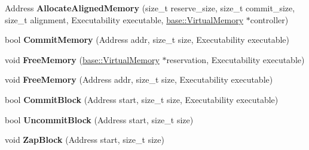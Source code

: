 \begin{DoxyCompactItemize}
\item 
Address {\bfseries Allocate\+Aligned\+Memory} (size\+\_\+t reserve\+\_\+size, size\+\_\+t commit\+\_\+size, size\+\_\+t alignment, Executability executable, \hyperlink{classv8_1_1base_1_1_virtual_memory}{base\+::\+Virtual\+Memory} $\ast$controller)\hypertarget{classv8_1_1internal_1_1_memory_allocator_ab46b93127fa4d64c152008473f9465db}{}\label{classv8_1_1internal_1_1_memory_allocator_ab46b93127fa4d64c152008473f9465db}

\item 
bool {\bfseries Commit\+Memory} (Address addr, size\+\_\+t size, Executability executable)\hypertarget{classv8_1_1internal_1_1_memory_allocator_a28dc1807acf9a4e1a2cbbe44a1cda03c}{}\label{classv8_1_1internal_1_1_memory_allocator_a28dc1807acf9a4e1a2cbbe44a1cda03c}

\item 
void {\bfseries Free\+Memory} (\hyperlink{classv8_1_1base_1_1_virtual_memory}{base\+::\+Virtual\+Memory} $\ast$reservation, Executability executable)\hypertarget{classv8_1_1internal_1_1_memory_allocator_a570b227a43f8f6a0fd72287ec03ea9ac}{}\label{classv8_1_1internal_1_1_memory_allocator_a570b227a43f8f6a0fd72287ec03ea9ac}

\item 
void {\bfseries Free\+Memory} (Address addr, size\+\_\+t size, Executability executable)\hypertarget{classv8_1_1internal_1_1_memory_allocator_aa92f0d4e1500cb293ce34782eb6abc57}{}\label{classv8_1_1internal_1_1_memory_allocator_aa92f0d4e1500cb293ce34782eb6abc57}

\item 
bool {\bfseries Commit\+Block} (Address start, size\+\_\+t size, Executability executable)\hypertarget{classv8_1_1internal_1_1_memory_allocator_af61bfabd2135e51c98481350167da15d}{}\label{classv8_1_1internal_1_1_memory_allocator_af61bfabd2135e51c98481350167da15d}

\item 
bool {\bfseries Uncommit\+Block} (Address start, size\+\_\+t size)\hypertarget{classv8_1_1internal_1_1_memory_allocator_a29690b451bbe497371e041731a9d5057}{}\label{classv8_1_1internal_1_1_memory_allocator_a29690b451bbe497371e041731a9d5057}

\item 
void {\bfseries Zap\+Block} (Address start, size\+\_\+t size)\hypertarget{classv8_1_1internal_1_1_memory_allocator_a5eb45a18bdab6189ae18dc1df48d8005}{}\label{classv8_1_1internal_1_1_memory_allocator_a5eb45a18bdab6189ae18dc1df48d8005}


\end{DoxyCompactItemize}
